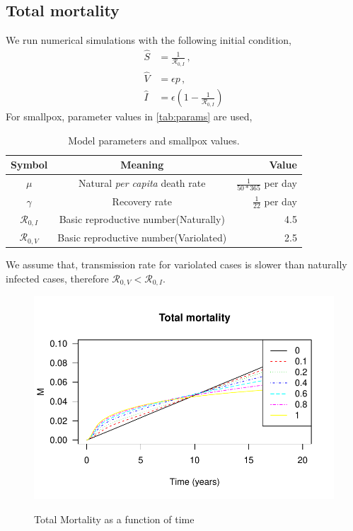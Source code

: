 \documentclass[12pt]{article}
\newcommand{\R}{\mathcal{R}}
\begin{document}
\subsection{Total mortality}
We run numerical simulations with the following initial condition,
\begin{subequations}
\begin{align}
\hat{S}&=\frac{1}{\R_{0,I}}\,,\\
\hat{V}&=\epsilon p\,,\\
\hat{I}&=\epsilon(1-\frac{1}{\R_{0,I}})
\end{align}
\end{subequations}
For smallpox, parameter values in \autoref{tab:params} are used, 
\begin{table}[H]
\begin{center}
\caption{Model parameters and smallpox values.}
\label{tab:params}
\smallskip
\begin{tabular}{c|c|r}
{\bfseries Symbol} & {\bfseries Meaning} & {\bfseries Value} \\\hline
$\mu$ & Natural \emph{per capita} death rate & $\frac{1}{50*365}$ per day \\
$\gamma$ & Recovery rate & $\frac{1}{22}$ per day \\
$\R_{0,I}$ & Basic reproductive number(Naturally) & 4.5\\
$\R_{0,V}$ & Basic reproductive number(Variolated) & 2.5
\end{tabular}
\end{center}
\end{table}

We assume that, transmission rate for variolated cases is slower than naturally infected cases, therefore $\R_{0,V}<\R_{0,I}$.

\begin{figure}[H]
  \centering\label{IatEE}
  \includegraphics[width=1\textwidth]                 {Figures/Total_Mortality.pdf}
  \caption{Total Mortality as a function of time}
\end{figure}
\end{document}
